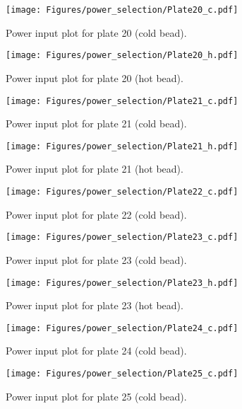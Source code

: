 \begin{figure}[htp]
   \centering
   \texttt{[image: Figures/power\_selection/Plate20\_c.pdf]}
   \caption{Power input plot for plate 20 (cold bead). }
\end{figure}


\begin{figure}[htp]
   \centering
   \texttt{[image: Figures/power\_selection/Plate20\_h.pdf]}
   \caption{Power input plot for plate 20 (hot bead). }
\end{figure}


\begin{figure}[htp]
   \centering
   \texttt{[image: Figures/power\_selection/Plate21\_c.pdf]}
   \caption{Power input plot for plate 21 (cold bead). }
\end{figure}


\begin{figure}[htp]
   \centering
   \texttt{[image: Figures/power\_selection/Plate21\_h.pdf]}
   \caption{Power input plot for plate 21 (hot bead). }
\end{figure}


\begin{figure}[htp]
   \centering
   \texttt{[image: Figures/power\_selection/Plate22\_c.pdf]}
   \caption{Power input plot for plate 22 (cold bead). }
\end{figure}


\begin{figure}[htp]
   \centering
   \texttt{[image: Figures/power\_selection/Plate23\_c.pdf]}
   \caption{Power input plot for plate 23 (cold bead). }
\end{figure}


\begin{figure}[htp]
   \centering
   \texttt{[image: Figures/power\_selection/Plate23\_h.pdf]}
   \caption{Power input plot for plate 23 (hot bead). }
\end{figure}


\begin{figure}[htp]
   \centering
   \texttt{[image: Figures/power\_selection/Plate24\_c.pdf]}
   \caption{Power input plot for plate 24 (cold bead). }
\end{figure}


\begin{figure}[htp]
   \centering
   \texttt{[image: Figures/power\_selection/Plate25\_c.pdf]}
   \caption{Power input plot for plate 25 (cold bead). }
\end{figure}
